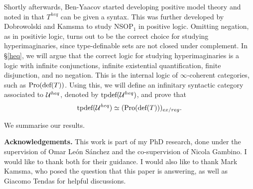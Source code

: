 \smallskip

Shortly afterwards, Ben-Yaacov started developing positive model theory and noted in \cite[Example 2.16]{Ben-Yaacov2003-BENPMT} that $T^{heq}$ can be given a syntax. This was further developed by Dobrowolski and Kamsma \cite{DobrowolskiJan2022Kipl} to study NSOP$_1$ in positive logic. Omitting negation, as in positivie logic, turns out to be the correct choice for studying hyperimaginaries, since type-definable sets are not closed under complement. In \S\ref{heq}, we will argue that the correct logic for studying hyperimaginaries is a logic with infinite conjunctions, infinite existential quantification, finite disjunction, and no negation. This is the internal logic of $\infty$-coherent categories, such as $\textup{Pro}(\textup{def}(T))$. Using this, we will define an infinitary syntactic category associated to $\mathcal{U}^{heq}$, denoted by $\textup{tpdef}(\mathcal{U}^{heq})$, and prove that 
\[\textup{tpdef}(\mathcal{U}^{heq}) \simeq (\textup{Pro}(\textup{def}(T)))_{ex/reg}. \] 

We summarise our results.

\begin{mainthm}
    
\end{mainthm}

\smallskip

\noindent\textbf{Acknowledgements.} This work is part of my PhD research, done under the supervision of Omar Le\'on S\'anchez and the co-supervision of Nicola Gambino. I would like to thank both for their guidance. I would also like to thank Mark Kamsma, who posed the question that this paper is answering, as well as Giacomo Tendas for helpful discussions. 
